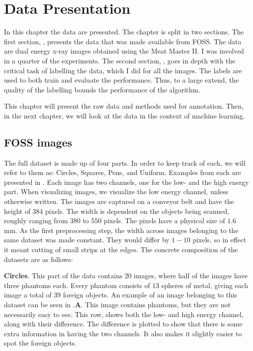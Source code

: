 \chapter{Data Presentation}
\label{chap:datapres}
In this chapter the data are presented.  
The chapter is split in two sections. 
The first section, , presents the data that was made available from FOSS. The data are dual energy x-ray images obtained using the Meat Master II. 
I was involved in a quarter of the experiments.
The second section, , goes in depth with the critical task of labelling the data, which I did for all the images. 
The labels are used to both train and evaluate the performance.
Thus, to a large extend, the quality of the labelling bounds the performance of the algorithm. 

This chapter will present the raw data and methods used for annotation.
Then, in the next chapter, we will look at the data in the context of machine learning.
\section{FOSS images}
\label{sec:data_press}
The full dataset is made up of four parts. In order to keep track of each, we will refer to them as: Circles, Squares, Pens, and Uniform. Examples from each are presented in .
Each image has two channels, one for the low- and the high energy part. 
When visualizing images, we visualize the low energy channel, unless otherwise written.
The images are captured on a conveyor belt and have the height of $384$ pixels. The width is dependent on the objects being scanned, roughly ranging from $380$ to $550$ pixels. 
The pixels have a physical size of $1.6$ mm. 
As the first preprocessing step, the width across images belonging to the same dataset was made constant. They would differ by $1-10$ pixels, so in effect it meant cutting of small strips at the edges.
The concrete composition of the datasets are as follows:

\textbf{Circles}. This part of the data contains $20$ images, where half of the images have three phantoms each. Every phantom consists of $13$ spheres of metal, giving each image a total of $39$ foreign objects. 
An example of an image belonging to this dataset can be seen in .\textbf{A}. This image contains phantoms, but they are not necessarily easy to see. This row, shows both the low- and high energy channel, along with their difference. The difference is plotted to show that there is some extra information in having the two channels. It also makes it slightly easier to spot the foreign objects.


